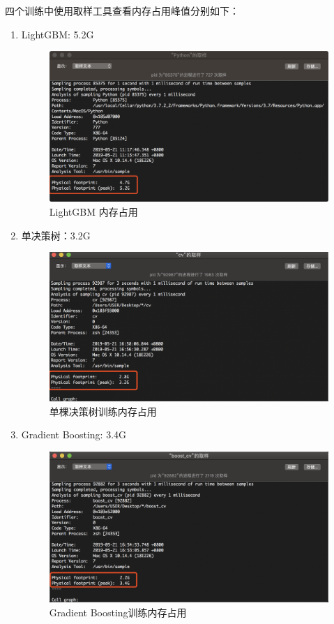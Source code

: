 \documentclass[12pt]{article}
\begin{document}
四个训练中使用取样工具查看内存占用峰值分别如下：
\begin{enumerate}
    \item LightGBM: 5.2G
    \begin{figure}[H]
        \centering
        \includegraphics[scale=0.46]{lgb-memory.png}
        \caption{LightGBM 内存占用}
        \label{}
    \end{figure}

    \item 单决策树：3.2G
    \begin{figure}[H]
        \centering
        \includegraphics[scale=0.5]{single-tree-memory.png}
        \caption{单棵决策树训练内存占用}
        \label{}
    \end{figure}

    \item Gradient Boosting: 3.4G
    \begin{figure}[H]
        \centering
        \includegraphics[scale=0.44]{gbdt-memory.png}
        \caption{Gradient Boosting训练内存占用}
        \label{}
    \end{figure}


\end{enumerate}
\end{document}
